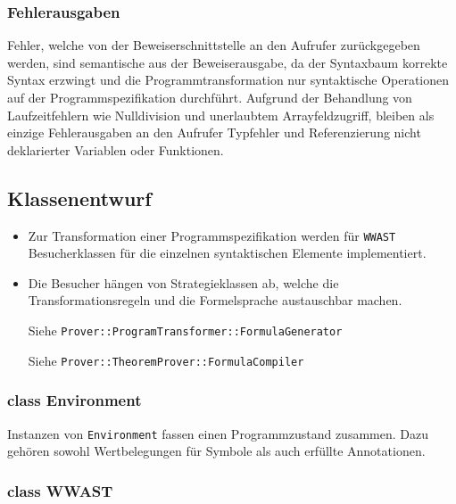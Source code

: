 \subsubsection{Fehlerausgaben}%

Fehler, welche von der Beweiserschnittstelle an den Aufrufer
zurückgegeben werden, sind semantische aus der Beweiserausgabe, da der
Syntaxbaum korrekte Syntax erzwingt und die Programmtransformation nur
syntaktische Operationen auf der Programmspezifikation durchführt.
Aufgrund der Behandlung von Laufzeitfehlern wie Nulldivision und
unerlaubtem Arrayfeldzugriff, bleiben als einzige Fehlerausgaben an
den Aufrufer Typfehler und Referenzierung nicht deklarierter Variablen
oder Funktionen.%

\subsection{Klassenentwurf}%

\begin{itemize}%

    \item Zur Transformation einer Programmspezifikation werden für
    \texttt{WWAST} Besucherklassen für die einzelnen syntaktischen
    Elemente implementiert.%

    \item Die Besucher hängen von Strategieklassen ab, welche die
    Transformationsregeln und die Formelsprache austauschbar machen.%

    Siehe \texttt{Prover::ProgramTransformer::FormulaGenerator}%

    Siehe \texttt{Prover::TheoremProver::FormulaCompiler}%


\end{itemize}%

\subsubsection{class Environment}%

Instanzen von \texttt{Environment} fassen einen Programmzustand
zusammen. Dazu gehören sowohl Wertbelegungen für Symbole als auch
erfüllte Annotationen.%

\subsubsection{class WWAST}%

